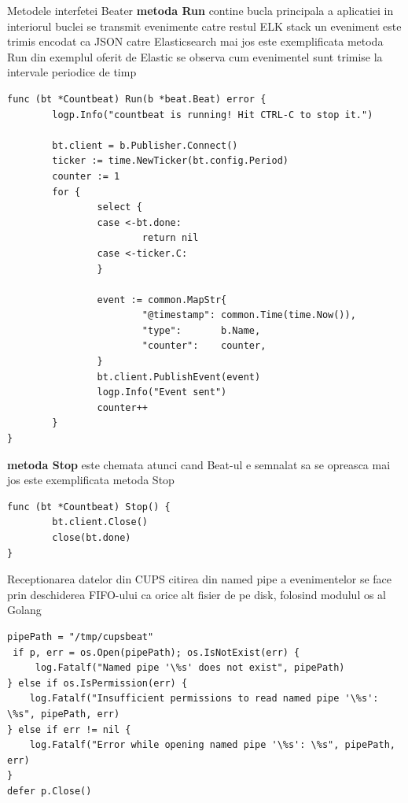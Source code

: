 \documentclass[12pt]{report}
\begin{document}
\begin{outline}
\1 {\large Metodele interfetei Beater}
	\2
	\textbf{metoda Run}
		\3 contine bucla principala a aplicatiei
		\3 in interiorul buclei se transmit evenimente catre restul ELK stack
		\3 un eveniment este trimis encodat ca JSON catre Elasticsearch
		\3 mai jos este exemplificata metoda Run din exemplul oferit de Elastic
		\3 se observa cum evenimentel sunt trimise la intervale periodice de timp
\begin{lstlisting}[caption={exemplu metoda Run - golang},captionpos=b]
func (bt *Countbeat) Run(b *beat.Beat) error {
        logp.Info("countbeat is running! Hit CTRL-C to stop it.")

        bt.client = b.Publisher.Connect()
        ticker := time.NewTicker(bt.config.Period)
        counter := 1
        for {
                select {
                case <-bt.done:
                        return nil
                case <-ticker.C:
                }

                event := common.MapStr{ 
                        "@timestamp": common.Time(time.Now()), 
                        "type":       b.Name,
                        "counter":    counter,
                }
                bt.client.PublishEvent(event) 
                logp.Info("Event sent")
                counter++
        }
}
\end{lstlisting}

	\2
	\textbf{metoda Stop}
		\3 este chemata atunci cand Beat-ul e semnalat sa se opreasca
		\3 mai jos este exemplificata metoda Stop
\begin{lstlisting}[caption={exemplu metoda Stop - golang},captionpos=b]
func (bt *Countbeat) Stop() {
        bt.client.Close()
        close(bt.done)
}
\end{lstlisting}
\1  {\large Receptionarea datelor din CUPS}
	\2 citirea din named pipe a evenimentelor se face prin deschiderea FIFO-ului ca orice alt fisier de pe disk, folosind modulul os al Golang
\begin{lstlisting}[caption={deschidere named pipe - golang},captionpos=b]
pipePath = "/tmp/cupsbeat"
 if p, err = os.Open(pipePath); os.IsNotExist(err) {
     log.Fatalf("Named pipe '\%s' does not exist", pipePath)
} else if os.IsPermission(err) {
    log.Fatalf("Insufficient permissions to read named pipe '\%s': \%s", pipePath, err)
} else if err != nil {
    log.Fatalf("Error while opening named pipe '\%s': \%s", pipePath, err)
}
defer p.Close()
\end{lstlisting}


\end{outline}
\end{document}
